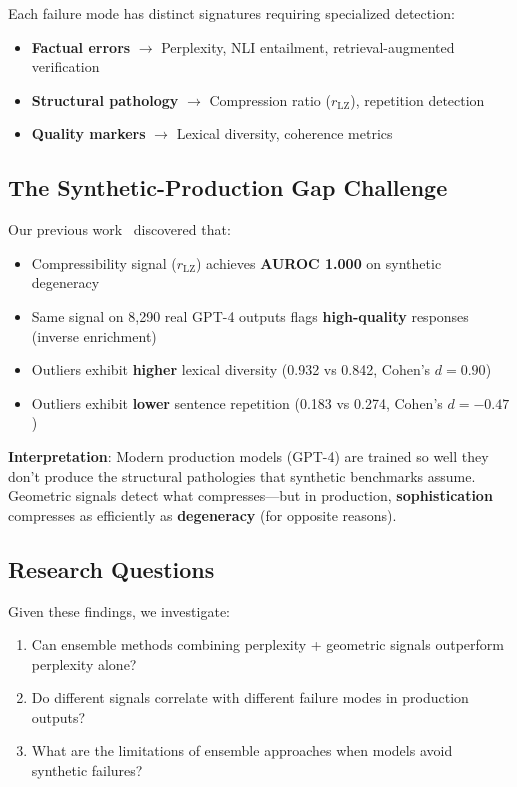 \documentclass[11pt]{article}
\begin{document}
Each failure mode has distinct signatures requiring specialized detection:
\begin{itemize}
\item \textbf{Factual errors} $\rightarrow$ Perplexity, NLI entailment, retrieval-augmented verification
\item \textbf{Structural pathology} $\rightarrow$ Compression ratio ($r_{\text{LZ}}$), repetition detection
\item \textbf{Quality markers} $\rightarrow$ Lexical diversity, coherence metrics
\end{itemize}

\subsection{The Synthetic-Production Gap Challenge}

Our previous work~\cite{khokhla2025synthetic} discovered that:
\begin{itemize}
\item Compressibility signal ($r_{\text{LZ}}$) achieves \textbf{AUROC 1.000} on synthetic degeneracy
\item Same signal on 8,290 real GPT-4 outputs flags \textbf{high-quality} responses (inverse enrichment)
\item Outliers exhibit \textbf{higher} lexical diversity (0.932 vs 0.842, Cohen's $d=0.90$)
\item Outliers exhibit \textbf{lower} sentence repetition (0.183 vs 0.274, Cohen's $d=-0.47$)
\end{itemize}

\textbf{Interpretation}: Modern production models (GPT-4) are trained so well they don't produce the structural pathologies that synthetic benchmarks assume. Geometric signals detect what compresses---but in production, \textbf{sophistication} compresses as efficiently as \textbf{degeneracy} (for opposite reasons).

\subsection{Research Questions}

Given these findings, we investigate:
\begin{enumerate}
\item Can ensemble methods combining perplexity + geometric signals outperform perplexity alone?
\item Do different signals correlate with different failure modes in production outputs?
\item What are the limitations of ensemble approaches when models avoid synthetic failures?
\end{enumerate}
\end{document}
